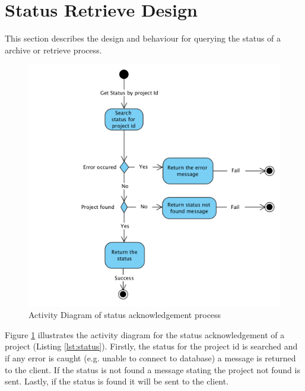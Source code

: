 \section{Status Retrieve Design}
This section describes the design and behaviour for querying the status of a archive or retrieve process.

\begin{figure}[H]
    \centering \includegraphics[scale=0.7]{grafiken/activityStatus.png}
    \caption{Activity Diagram of status acknowledgement process}
    \label{fig:activityStatus}
\end{figure}

Figure \ref{fig:activityStatus} illustrates the activity diagram for the status acknowledgement of a project (Listing \ref{lst:status}). Firstly,
the status for the project id is searched and if any error is caught (e.g. unable to connect to database) a message is returned to the client. If the 
status is not found a message stating the project not found is sent. Lastly, if the status is found it will be sent to the client.

